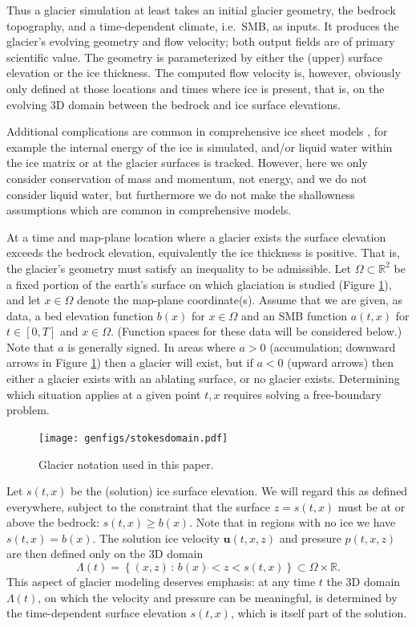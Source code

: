\documentclass[hidelinks,onefignum,onetabnum,final]{siamart220329}  %
\newcommand{\RR}{\mathbb{R}}
\newcommand{\bu}{\mathbf{u}}
\begin{document}
Thus a glacier simulation at least takes an initial glacier geometry, the bedrock topography, and a time-dependent climate, i.e.~SMB, as inputs.  It produces the glacier's evolving geometry and flow velocity; both output fields are of primary scientific value.  The geometry is parameterized by either the (upper) surface elevation or the ice thickness.  The computed flow velocity is, however, obviously only defined at those locations and times where ice is present, that is, on the evolving 3D domain between the bedrock and ice surface elevations.

Additional complications are common in comprehensive ice sheet models \cite{SchoofHewitt2013}, for example the internal energy of the ice \cite{Aschwandenetal2012} is simulated, and/or liquid water within the ice matrix or at the glacier surfaces is tracked.  However, here we only consider conservation of mass and momentum, not energy, and we do not consider liquid water, but furthermore we do not make the shallowness assumptions which are common in comprehensive models.

At a time and map-plane location where a glacier exists the surface elevation exceeds the bedrock elevation, equivalently the ice thickness is positive.  That is, the glacier's geometry must satisfy an inequality to be admissible.  Let $\Omega \subset \RR^2$ be a fixed portion of the earth's surface on which glaciation is studied (Figure \ref{fig:stokesdomain}), and let $x\in\Omega$ denote the map-plane coordinate(s).  Assume that we are given, as data, a bed elevation function $b(x)$ for $x\in\Omega$ and an SMB function $a(t,x)$ for $t\in [0,T]$ and $x\in \Omega$.  (Function spaces for these data will be considered below.)  Note that $a$ is generally signed.  In areas where $a>0$ (accumulation; downward arrows in Figure \ref{fig:stokesdomain}) then a glacier will exist, but if $a<0$ (upward arrows) then either a glacier exists with an ablating surface, or no glacier exists.  Determining which situation applies at a given point $t,x$ requires solving a free-boundary problem.

\medskip
\begin{figure}[ht]
\centering
\texttt{[image: genfigs/stokesdomain.pdf]}
\caption{Glacier notation used in this paper.}
\label{fig:stokesdomain}
\end{figure}

\medskip
Let $s(t,x)$ be the (solution) ice surface elevation.  We will regard this as defined everywhere, subject to the constraint that the surface $z=s(t,x)$ must be at or above the bedrock: $s(t,x) \ge b(x)$.  Note that in regions with no ice we have $s(t,x)=b(x)$.  The solution ice velocity $\bu(t,x,z)$ and pressure $p(t,x,z)$ are then defined only on the 3D domain
\begin{equation}
\Lambda(t) = \left\{(x,z)\,:\,b(x) < z < s(t,x)\right\} \subset \Omega \times \RR. \label{eq:icydomain}
\end{equation}
This aspect of glacier modeling deserves emphasis: at any time $t$ the 3D domain $\Lambda(t)$, on which the velocity and pressure can be meaningful, is determined by the time-dependent surface elevation $s(t,x)$, which is itself part of the solution.
\end{document}

